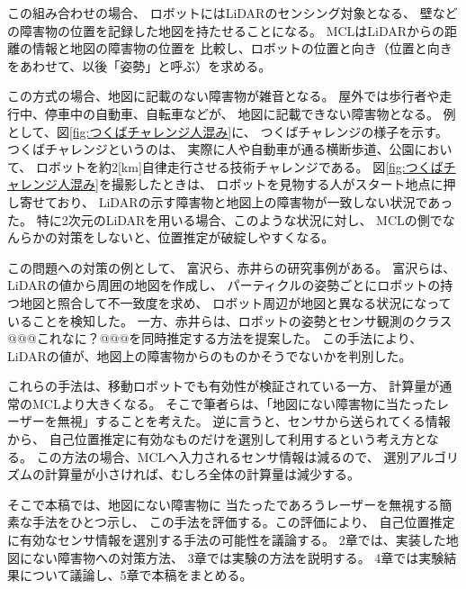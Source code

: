 \documentclass{jarticle}
\begin{document}
この組み合わせの場合、
ロボットにはLiDARのセンシング対象となる、
壁などの障害物の位置を記録した地図を持たせることになる。
MCLはLiDARからの距離の情報と地図の障害物の位置を
比較し、ロボットの位置と向き（位置と向きをあわせて、以後「姿勢」と呼ぶ）を求める。


この方式の場合、地図に記載のない障害物が雑音となる。
屋外では歩行者や走行中、停車中の自動車、自転車などが、
地図に記載できない障害物となる。
例として、図\ref{fig:つくばチャレンジ人混み}に、
つくばチャレンジ\cite{つくばチャレンジ}の様子を示す。
つくばチャレンジというのは、
実際に人や自動車が通る横断歩道、公園において、
ロボットを約2[km]自律走行させる技術チャレンジである。
図\ref{fig:つくばチャレンジ人混み}を撮影したときは、
ロボットを見物する人がスタート地点に押し寄せており、
LiDARの示す障害物と地図上の障害物が一致しない状況であった。
特に2次元のLiDARを用いる場合、このような状況に対し、
MCLの側でなんらかの対策をしないと、位置推定が破綻しやすくなる。

この問題への対策の例として、
富沢ら\cite{富沢2012}、赤井ら\cite{赤井2019}の研究事例がある。
富沢ら\cite{富沢2012}は、LiDARの値から周囲の地図を作成し、
パーティクルの姿勢ごとにロボットの持つ地図と照合して不一致度を求め、
ロボット周辺が地図と異なる状況になっていることを検知した。
一方、赤井ら\cite{赤井2019}は、ロボットの姿勢とセンサ観測のクラス
@@@これなに？@@@を同時推定する方法を提案した。
この手法により、LiDARの値が、地図上の障害物からのものかそうでないかを判別した。


これらの手法は、移動ロボットでも有効性が検証されている一方、
計算量が通常のMCLより大きくなる。
そこで筆者らは、「地図にない障害物に当たったレーザーを無視」することを考えた。
逆に言うと、センサから送られてくる情報から、
自己位置推定に有効なものだけを選別して利用するという考え方となる。
この方法の場合、MCLへ入力されるセンサ情報は減るので、
選別アルゴリズムの計算量が小さければ、むしろ全体の計算量は減少する。

そこで本稿では、地図にない障害物に
当たったであろうレーザーを無視する簡素な手法をひとつ示し、
この手法を評価する。この評価により、
自己位置推定に有効なセンサ情報を選別する手法の可能性を議論する。
2章では、実装した地図にない障害物への対策方法、
3章では実験の方法を説明する。
4章では実験結果について議論し、5章で本稿をまとめる。
\end{document}
